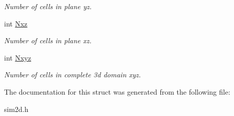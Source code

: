 \begin{DoxyCompactItemize}
\begin{DoxyCompactList}\small\item\em Number of cells in plane yz. \end{DoxyCompactList}\item 
\hypertarget{struct_dimension_a864e1f098bb029310a6f348276e22546}{}int \hyperlink{struct_dimension_a864e1f098bb029310a6f348276e22546}{Nxz}\label{struct_dimension_a864e1f098bb029310a6f348276e22546}

\begin{DoxyCompactList}\small\item\em Number of cells in plane xz. \end{DoxyCompactList}\item 
\hypertarget{struct_dimension_a9d5f74088fcc5dd271f4d01e14075f29}{}int \hyperlink{struct_dimension_a9d5f74088fcc5dd271f4d01e14075f29}{Nxyz}\label{struct_dimension_a9d5f74088fcc5dd271f4d01e14075f29}

\begin{DoxyCompactList}\small\item\em Number of cells in complete 3d domain xyz. \end{DoxyCompactList}\end{DoxyCompactItemize}


The documentation for this struct was generated from the following file\+:\begin{DoxyCompactItemize}
\item 
sim2d.\+h\end{DoxyCompactItemize}
